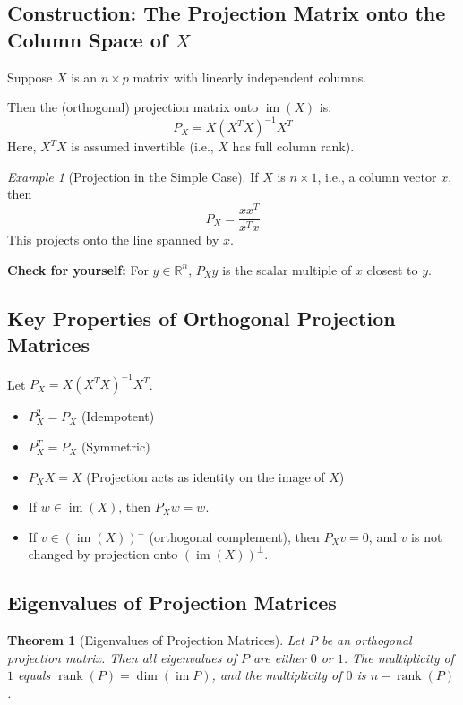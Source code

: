 \documentclass[11pt,a4paper]{article}
\theoremstyle{definition}
\theoremstyle{plain}
\newtheorem{theorem}[definition]{Theorem}
\theoremstyle{remark}
\newtheorem{example}[definition]{Example}
\begin{document}
\subsection{Construction: The Projection Matrix onto the Column Space of $X$}

Suppose $X$ is an $n \times p$ matrix with linearly independent columns.

Then the (orthogonal) projection matrix onto $\operatorname{im}(X)$ is:
\begin{equation}
    P_X = X (X^T X)^{-1} X^T
\end{equation}
Here, $X^T X$ is assumed invertible (i.e., $X$ has full column rank).

\begin{example}[Projection in the Simple Case]
If $X$ is $n \times 1$, i.e., a column vector $x$, then
\[
P_X = \frac{x x^T}{x^T x}
\]
This projects onto the line spanned by $x$.

\textbf{Check for yourself:} For $y \in \mathbb{R}^n$, $P_X y$ is the scalar multiple of $x$ closest to $y$.
\end{example}

\subsection{Key Properties of Orthogonal Projection Matrices}

Let $P_X = X (X^T X)^{-1} X^T$.

\begin{itemize}
    \item $P_X^2 = P_X$ \hfill (Idempotent)
    \item $P_X^T = P_X$ \hfill (Symmetric)
    \item $P_X X = X$ \hfill (Projection acts as identity on the image of $X$)
    \item If $w \in \operatorname{im}(X)$, then $P_X w = w$.
    \item If $v \in (\operatorname{im}(X))^\perp$ (orthogonal complement), then $P_X v = 0$, and $v$ is not changed by projection onto $(\operatorname{im}(X))^\perp$.
\end{itemize}

\subsection{Eigenvalues of Projection Matrices}

\begin{theorem}[Eigenvalues of Projection Matrices]
Let $P$ be an orthogonal projection matrix. Then all eigenvalues of $P$ are either $0$ or $1$. The multiplicity of $1$ equals $\operatorname{rank}(P) = \dim(\operatorname{im} P)$, and the multiplicity of $0$ is $n - \operatorname{rank}(P)$.
\end{theorem}
\end{document}
